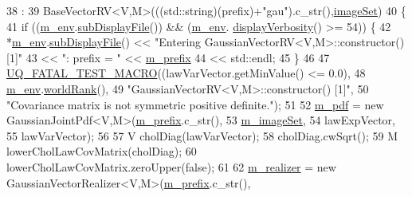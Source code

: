 \begin{DoxyCode}
38   :
39   BaseVectorRV<V,M>(((std::string)(prefix)+\textcolor{stringliteral}{"gau"}).c\_str(),\hyperlink{class_q_u_e_s_o_1_1_base_vector_r_v_aa4dd2f036228eac1f945bacc7147a922}{imageSet})
40 \{
41   \textcolor{keywordflow}{if} ((\hyperlink{class_q_u_e_s_o_1_1_base_vector_r_v_a556761c50e2d171977ef5f19a63c8c73}{m\_env}.\hyperlink{class_q_u_e_s_o_1_1_base_environment_a8a0064746ae8dddfece4229b9ad374d6}{subDisplayFile}()) && (\hyperlink{class_q_u_e_s_o_1_1_base_vector_r_v_a556761c50e2d171977ef5f19a63c8c73}{m\_env}.
      \hyperlink{class_q_u_e_s_o_1_1_base_environment_a1fe5f244fc0316a0ab3e37463f108b96}{displayVerbosity}() >= 54)) \{
42     *\hyperlink{class_q_u_e_s_o_1_1_base_vector_r_v_a556761c50e2d171977ef5f19a63c8c73}{m\_env}.\hyperlink{class_q_u_e_s_o_1_1_base_environment_a8a0064746ae8dddfece4229b9ad374d6}{subDisplayFile}() << \textcolor{stringliteral}{"Entering GaussianVectorRV<V,M>::constructor() [1]"}
43                             << \textcolor{stringliteral}{": prefix = "} << \hyperlink{class_q_u_e_s_o_1_1_base_vector_r_v_a030ce3bc9873a9eaf6d8bf452c096ab3}{m\_prefix}
44                             << std::endl;
45   \}
46 
47   \hyperlink{_defines_8h_a56d63d18d0a6d45757de47fcc06f574d}{UQ\_FATAL\_TEST\_MACRO}((lawVarVector.getMinValue() <= 0.0),
48                       \hyperlink{class_q_u_e_s_o_1_1_base_vector_r_v_a556761c50e2d171977ef5f19a63c8c73}{m\_env}.\hyperlink{class_q_u_e_s_o_1_1_base_environment_a78b57112bbd0e6dd0e8afec00b40ffa7}{worldRank}(),
49                       \textcolor{stringliteral}{"GaussianVectorRV<V,M>::constructor() [1]"},
50                       \textcolor{stringliteral}{"Covariance matrix is not symmetric positive definite."});
51 
52   \hyperlink{class_q_u_e_s_o_1_1_base_vector_r_v_a0ca926bca6fbcc688be6fc7496449e8e}{m\_pdf} = \textcolor{keyword}{new} GaussianJointPdf<V,M>(\hyperlink{class_q_u_e_s_o_1_1_base_vector_r_v_a030ce3bc9873a9eaf6d8bf452c096ab3}{m\_prefix}.c\_str(),
53                                             \hyperlink{class_q_u_e_s_o_1_1_base_vector_r_v_ad31872bb4da22d47528cb9d691b3b7ff}{m\_imageSet},
54                                             lawExpVector,
55                                             lawVarVector);
56 
57   V cholDiag(lawVarVector);
58   cholDiag.cwSqrt();
59   M lowerCholLawCovMatrix(cholDiag);
60   lowerCholLawCovMatrix.zeroUpper(\textcolor{keyword}{false});
61 
62   \hyperlink{class_q_u_e_s_o_1_1_base_vector_r_v_ad99bc05293c0fd0a0accb3191fb7119e}{m\_realizer} = \textcolor{keyword}{new} GaussianVectorRealizer<V,M>(\hyperlink{class_q_u_e_s_o_1_1_base_vector_r_v_a030ce3bc9873a9eaf6d8bf452c096ab3}{m\_prefix}.c\_str(),

\end{DoxyCode}
